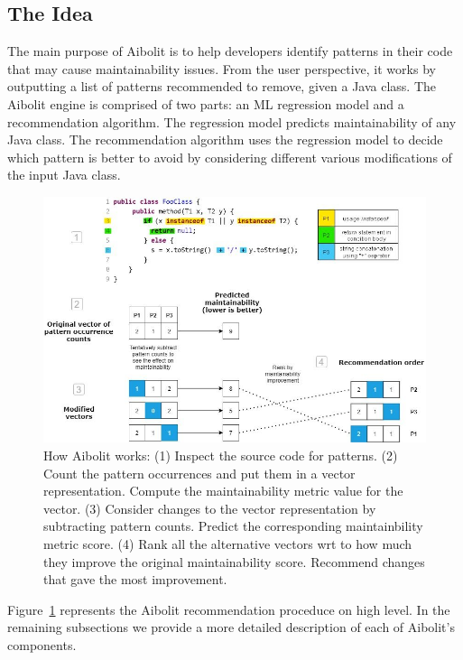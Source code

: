 
\subsection{The Idea}

The main purpose of Aibolit is to help developers identify  patterns in their
code that may cause maintainability issues. From the user perspective, it works
by outputting a list of patterns recommended to remove, given a Java class. The
Aibolit engine is comprised of two parts: an ML regression model and a
recommendation algorithm. The regression model  predicts maintainability of any
Java class. The recommendation algorithm uses the regression model to decide
which pattern is better to avoid by considering different various modifications
of the input Java class.

\begin{figure}[t]
\includegraphics[width=13cm]{how_it_works_diagram_5.jpg}
\centering
\vspace{1 cm}
\caption{How Aibolit works: (1) Inspect the source code for patterns.
(2) Count the pattern occurrences and put them in a vector representation.
Compute the maintainability metric value for the vector.
(3) Consider changes to the vector representation by subtracting pattern counts.
Predict the corresponding maintainbility metric score.
(4) Rank all the alternative vectors wrt to how much they improve the original
maintainability score. Recommend changes that gave the most improvement.}
\label{fig:aibolit_graphic}
\end{figure}

Figure~\ref{fig:aibolit_graphic} represents the Aibolit recommendation proceduce on high level.
In the remaining subsections we provide a more detailed
description of each of Aibolit's components.

